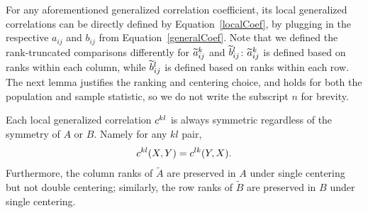 \documentclass[11pt]{extarticle}
\begin{document}
For any aforementioned generalized correlation coefficient, its local generalized correlations can be directly defined by Equation~\ref{localCoef}, by plugging in the respective $a_{ij}$ and $b_{ij}$ from Equation~\ref{generalCoef}. Note that we defined the rank-truncated comparisons differently for $\widetilde{a}_{ij}^k$ and $\widetilde{b}_{ij}^l$: $\widetilde{a}_{ij}^k$ is defined based on ranks within each column, while $\widetilde{b}_{ij}^l$ is defined based on ranks within each row. The next lemma justifies the ranking and centering choice, and holds for both the population and sample statistic, so we do not write the subscript $n$ for brevity.

\begin{lem}
\label{lem2}
Each local generalized correlation $c^{kl}$ is always symmetric regardless of the symmetry of $A$ or $B$. Namely for any $kl$ pair,
\begin{align*}
c^{kl}(X,Y)=c^{lk}(Y,X).
\end{align*}
Furthermore, the column ranks of $\tilde{A}$ are preserved in $A$ under single centering but not double centering; similarly, the row ranks of $\tilde{B}$ are preserved in $B$ under single centering.
\end{lem}
\end{document}

